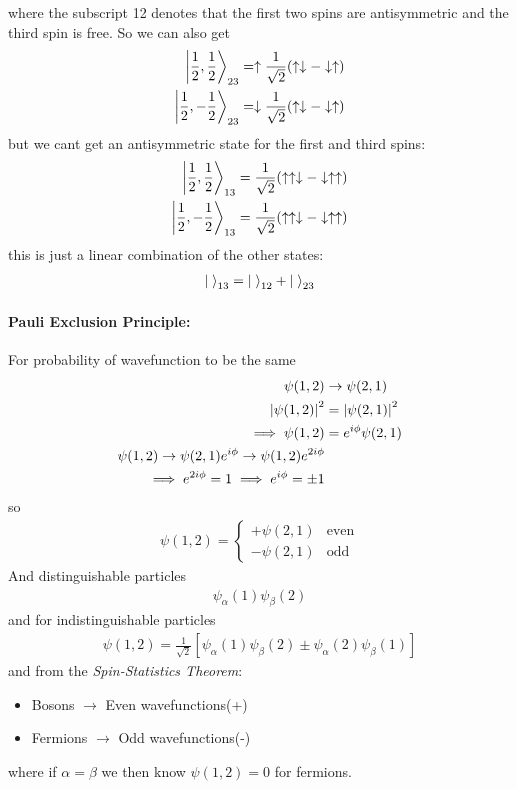 \documentclass[../main.tex]{subfiles}
\begin{document}
where the subscript 12 denotes that the first two spins are antisymmetric and the third spin is free. 
So we can also get
\begin{align*}
    \ket{\frac{1}{2}, \frac{1}{2}}_{23} = \uparrow \frac{1}{\sqrt 2} (\uparrow\downarrow - \downarrow\uparrow) \\
    \ket{\frac{1}{2}, -\frac{1}{2}}_{23} = \downarrow \frac{1}{\sqrt 2} (\uparrow\downarrow - \downarrow\uparrow)
\end{align*}
but we cant get an antisymmetric state for the first and third spins:
\begin{align*}
    \ket{\frac{1}{2}, \frac{1}{2}}_{13} = \frac{1}{\sqrt 2} (\uparrow\uparrow\downarrow - \downarrow\uparrow\uparrow) \\
    \ket{\frac{1}{2}, -\frac{1}{2}}_{13} = \frac{1}{\sqrt 2} (\uparrow\uparrow\downarrow - \downarrow\uparrow\uparrow)
\end{align*}
this is just a linear combination of the other states:
\begin{align*}
    \ket{\;}_{13} = \ket{\;}_{12} + \ket{\;}_{23}
\end{align*}
\paragraph*{Pauli Exclusion Principle:} For probability of wavefunction to be the same
\begin{align*}
    \psi(1, 2) &\to \psi(2,1) \\
    \abs{\psi(1,2)}^2 &= \abs{\psi(2,1)}^2\\
    \implies \psi(1,2) &= e^{i\phi} \psi(2,1)\\
    \psi(1,2) \to \psi(2,1) e^{i\phi} \to \psi(1,2) e^{2i\phi} \\
    \implies e^{2i\phi} = 1 \implies e^{i\phi} = \pm 1
\end{align*}
so
\begin{align*}
    \psi(1,2) = \begin{cases}
        +\psi(2,1) & \text{even} \\
        -\psi(2,1) & \text{odd}
    \end{cases}
\end{align*}
And distinguishable particles
\begin{align*}
    \psi_\alpha(1) \psi_\beta(2)
\end{align*}
and for indistinguishable particles
\begin{align*}
    \psi(1,2) = \frac{1}{\sqrt 2} [\psi_\alpha(1) \psi_\beta(2) \pm \psi_\alpha(2) \psi_\beta(1)]
\end{align*}
and from the \emph{Spin-Statistics Theorem}:
\begin{itemize}
    \item Bosons $\to$ Even wavefunctions(+)
    \item Fermions $\to$ Odd wavefunctions(-)
\end{itemize}
where if $\alpha = \beta$ we then know $\psi(1,2) = 0$ for fermions.
\end{document}
